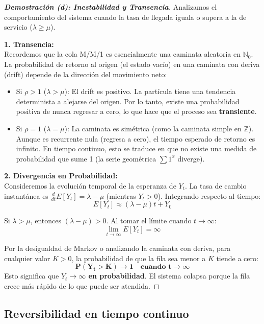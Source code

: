 \documentclass[10pt,a4paper]{article}
\begin{document}
\begin{proof}[\textbf{Demostración (d): Inestabilidad y Transencia}]
    Analizamos el comportamiento del sistema cuando la tasa de llegada iguala o supera a la de servicio ($\lambda \ge \mu$).
    
    \textbf{1. Transencia:} \\
    Recordemos que la cola M/M/1 es esencialmente una caminata aleatoria en $\mathbb{N}_0$. La probabilidad de retorno al origen (el estado vacío) en una caminata con deriva (drift) depende de la dirección del movimiento neto:
    \begin{itemize}
        \item Si $\rho > 1$ ($\lambda > \mu$): El drift es positivo. La partícula tiene una tendencia determinista a alejarse del origen. Por lo tanto, existe una probabilidad positiva de nunca regresar a cero, lo que hace que el proceso sea \textbf{transiente}.
        \item Si $\rho = 1$ ($\lambda = \mu$): La caminata es simétrica (como la caminata simple en $\mathbb{Z}$). Aunque es recurrente nula (regresa a cero), el tiempo esperado de retorno es infinito. En tiempo continuo, esto se traduce en que no existe una medida de probabilidad que sume 1 (la serie geométrica $\sum 1^x$ diverge).
    \end{itemize}
    
    \textbf{2. Divergencia en Probabilidad:} \\
    Consideremos la evolución temporal de la esperanza de $Y_t$. La tasa de cambio instantánea es $\frac{d}{dt} E[Y_t] = \lambda - \mu$ (mientras $Y_t > 0$).
    Integrando respecto al tiempo:
    \[ E[Y_t] \approx (\lambda - \mu)t + Y_0 \]
    
    Si $\lambda > \mu$, entonces $(\lambda - \mu) > 0$. Al tomar el límite cuando $t \to \infty$:
    \[ \lim_{t \to \infty} E[Y_t] = \infty \]
    
    Por la desigualdad de Markov o analizando la caminata con deriva, para cualquier valor $K > 0$, la probabilidad de que la fila sea menor a $K$ tiende a cero:
    \[ \mathbf{P(Y_t > K) \to 1 \quad \text{cuando } t \to \infty} \]
    Esto significa que \textbf{$Y_t \to \infty$ en probabilidad}. El sistema colapsa porque la fila crece más rápido de lo que puede ser atendida.
\end{proof}

\newpage
\subsection{Reversibilidad en tiempo continuo}
\end{document}
